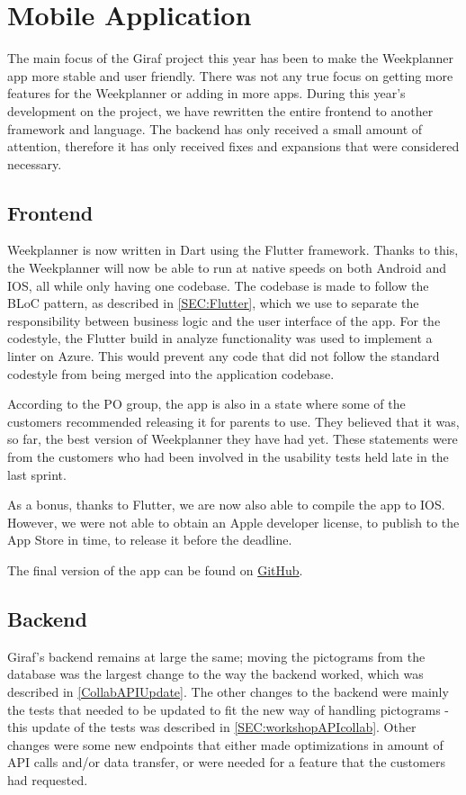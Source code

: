 \section{Mobile Application}
The main focus of the Giraf project this year has been to make the Weekplanner app more stable and user friendly.
There was not any true focus on getting more features for the Weekplanner or adding in more apps.
During this year's development on the project, we have rewritten the entire frontend to another framework and language.
The backend has only received a small amount of attention, therefore it has only received fixes and expansions that were considered necessary.

\subsection{Frontend}
Weekplanner is now written in Dart using the Flutter framework.
Thanks to this, the Weekplanner will now be able to run at native speeds on both Android and IOS, all while only having one codebase.
The codebase is made to follow the BLoC pattern, as described in \autoref{SEC:Flutter}, which we use to separate the responsibility between business logic and the user interface of the app. 
For the codestyle, the Flutter build in analyze functionality was used to implement a linter on Azure. 
This would prevent any code that did not follow the standard codestyle from being merged into the application codebase.

According to the PO group, the app is also in a state where some of the customers recommended releasing it for parents to use.
They believed that it was, so far, the best version of Weekplanner they have had yet.
These statements were from the customers who had been involved in the usability tests held late in the last sprint.

As a bonus, thanks to Flutter, we are now also able to compile the app to IOS.
However, we were not able to obtain an Apple developer license, to publish to the App Store in time, to release it before the deadline.

The final version of the app can be found on \href{https://github.com/aau-giraf/weekplanner/tree/2019-Final}{GitHub}.


\subsection{Backend}
Giraf's backend remains at large the same; moving the pictograms from the database was the largest change to the way the backend worked, which was described in \autoref{CollabAPIUpdate}.
The other changes to the backend were mainly the tests that needed to be updated to fit the new way of handling pictograms - this update of the tests was described in \autoref{SEC:workshopAPIcollab}.
Other changes were some new endpoints that either made optimizations in amount of API calls and/or data transfer, or were needed for a feature that the customers had requested.

